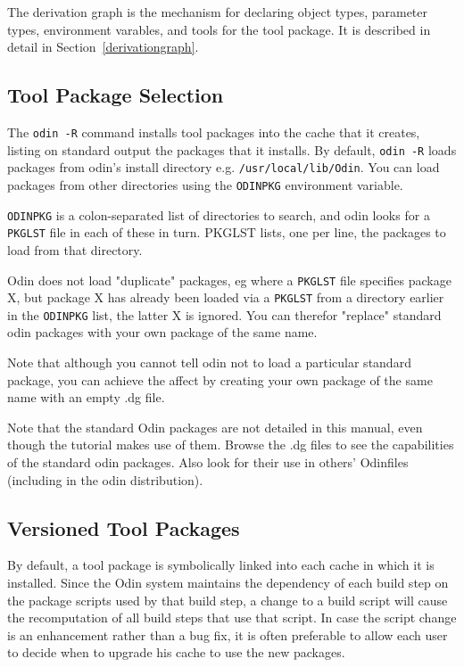 \documentclass[hidelinks]{report}
\newcommand{\ex}{\tt}   %
\begin{document}
The derivation graph is the mechanism for declaring
object types, parameter types, environment varables,
and tools for the tool package.
It is described in detail in Section~\ref{derivationgraph}.

\subsection{Tool Package Selection}

The {\ex odin -R} command installs tool packages into the cache that it
creates, listing on standard output the packages that it installs. By
default, {\ex odin -R} loads packages from odin's install directory
e.g. {\ex /usr/local/lib/Odin}. You can load packages from other directories
using the {\ex ODINPKG} environment variable.

{\ex ODINPKG} is a colon-separated list of directories to search, and
odin looks for a {\ex PKGLST} file in each of these in turn. PKGLST
lists, one per line, the packages to load from that directory.

Odin does not load "duplicate" packages, eg where a {\ex PKGLST} file
specifies package X, but package X has already been loaded via
a {\ex PKGLST} from a directory earlier in the {\ex ODINPKG} list,
the latter X is ignored. You can therefor "replace" standard odin
packages with your own package of the same name.

Note that although you cannot tell odin not to load a particular
standard package, you can achieve the affect by creating your
own package of the same name with an empty .dg file.

Note that the standard Odin packages are not detailed in this manual,
even though the tutorial makes use of them. Browse the .dg files
to see the capabilities of the standard odin packages. Also look
for their use in others' Odinfiles (including in the odin distribution).

\subsection{Versioned Tool Packages}

By default, a tool package is symbolically linked into each cache
in which it is installed.
Since the Odin system maintains the dependency of each build step
on the package scripts used by that build step,
a change to a build script will cause the recomputation of all
build steps that use that script.
In case the script change is an enhancement rather than a bug fix,
it is often preferable to allow each user to decide when to upgrade
his cache to use the new packages.
\end{document}
